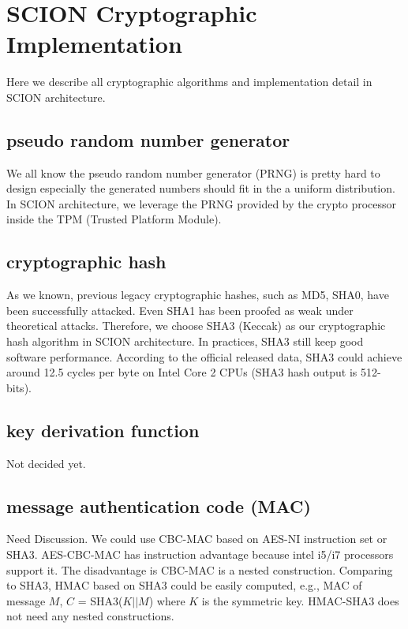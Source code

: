 
\section{SCION Cryptographic Implementation}

Here we describe all cryptographic algorithms and implementation detail in SCION architecture. 

\subsection{pseudo random number generator}
We all know the pseudo random number generator (PRNG) is pretty hard to design especially
the generated numbers should fit in the a uniform distribution.
In SCION architecture, we leverage the PRNG provided by the crypto processor inside
the TPM (Trusted Platform Module).

\subsection{cryptographic hash}
As we known, previous legacy cryptographic hashes, such as MD5, SHA0, have been successfully attacked. %
Even SHA1 has been proofed as weak under theoretical attacks. %
Therefore, we choose SHA3 (Keccak) as our cryptographic hash algorithm in SCION architecture.
In practices, SHA3 still keep good software performance. According to the official released data, 
SHA3 could achieve around 12.5 cycles per byte on Intel Core 2 CPUs (SHA3 hash output is 512-bits). 

\subsection{key derivation function}
Not decided yet.

\subsection{message authentication code (MAC)}
Need Discussion. We could use CBC-MAC based on AES-NI instruction set or SHA3.
AES-CBC-MAC has instruction advantage because intel i5/i7 processors support it.
The disadvantage is CBC-MAC is a nested construction.
Comparing to SHA3, HMAC based on SHA3 could be easily computed,
e.g., MAC of message $M$, $C$ = SHA3($K||M$) where $K$ is the symmetric key.
HMAC-SHA3 does not need any nested constructions.

